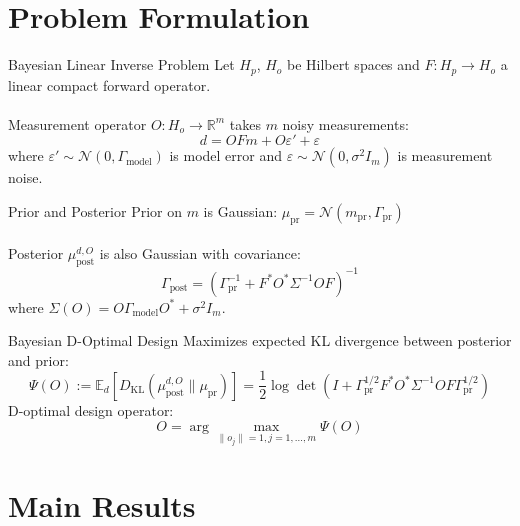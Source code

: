 \documentclass[aspectratio=169]{beamer}
\begin{document}
\section{Problem Formulation}

\begin{frame}{Bayesian Linear Inverse Problem}
Let $H_p$, $H_o$ be Hilbert spaces and $F: H_p \to H_o$ a linear compact forward operator.\\~\\
Measurement operator $O: H_o \to \mathbb{R}^m$ takes $m$ noisy measurements:
\begin{equation*}
    d = OFm + O\varepsilon' + \varepsilon
\end{equation*}
where $\varepsilon' \sim \mathcal{N}(0,\Gamma_\text{model})$ is model error and $\varepsilon \sim \mathcal{N}(0,\sigma^2I_m)$ is measurement noise.
\end{frame}

\begin{frame}{Prior and Posterior}
Prior on $m$ is Gaussian: $\mu_\text{pr} = \mathcal{N}(m_\text{pr},\Gamma_\text{pr})$\\~\\  
Posterior $\mu_\text{post}^{d,O}$ is also Gaussian with covariance:
\begin{equation*}
    \Gamma_\text{post} = \left( \Gamma_\text{pr}^{-1} + F^*O^*\Sigma^{-1}OF \right)^{-1}
\end{equation*}
where $\Sigma(O) = O\Gamma_\text{model}O^* + \sigma^2I_m$.
\end{frame}

\begin{frame}{Bayesian D-Optimal Design}
Maximizes expected KL divergence between posterior and prior:
\begin{equation*}
    \Psi(O) := \mathbb{E}_d\left[ D_\text{KL}(\mu_\text{post}^{d,O} \| \mu_\text{pr}) \right] = \frac{1}{2} \log\det\left(I + \Gamma_\text{pr}^{1/2}F^*O^*\Sigma^{-1}OF\Gamma_\text{pr}^{1/2}\right)
\end{equation*}
D-optimal design operator:
\begin{equation*}
    O = \arg\max_{\|o_j\|=1, j=1,\dots,m} \Psi(O)
\end{equation*}
\end{frame}

\section{Main Results}
\end{document}
